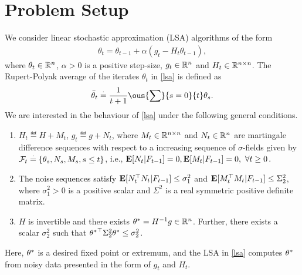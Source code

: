 \section{Problem Setup}
We consider linear stochastic approximation (LSA) algorithms of the form
\begin{align}\label{lsa}
\theta_{t}=\theta_{t-1}+\alpha(g_t-H_t\theta_{t-1}),
\end{align}
where $\theta_t\in \mathbb{R}^n$, $\alpha>0$ is a positive step-size, $g_t\in \mathbb{R}^n$ and $H_t\in \mathbb{R}^{n\times n}$. The Rupert-Polyak average of the iterates $\theta_t$ in \eqref{lsa} is defined as
\begin{align}\label{rp} \tb_t\eqdef \frac{1}{t+1}\ous{\sum}{s=0}{t} \theta_s. \end{align}
We are interested in the behaviour of \eqref{lsa} under the following general conditions.
\begin{assumption}\label{genlsa}
\begin{enumerate}
\item\label{mart} $H_t\eqdef H+M_t$, $g_t\eqdef g+N_t$, where $M_t\in \mathbb{R}^{n\times n}$ and $N_t\in \mathbb{R}^n$ are martingale difference sequences with respect to a increasing sequence of $\sigma$-fields given by $\mathcal{F}_t\stackrel{\cdot}{=} \{\theta_s, N_s,M_s,s\leq t\}$, i.e., $\mathbf{E}[N_t|F_{t-1}]=0,\mathbf{E}[M_t|F_{t-1}]=0,~\forall t\geq 0$.
\item \label{noise} The noise sequences satisfy $\mathbf{E}[N_t^\top N_t|F_{t-1}]\leq \sigma_1^2$ and $\mathbf{E}[M_t^\top M_t|F_{t-1}]\leq \Sigma_2^2$, where $\sigma_1^2>0$ is a positive scalar and $\Sigma^2$ is a real symmetric positive definite matrix.
\item \label{mat} $H$ is invertible and there exists $\theta^*=H^{-1}g\in\mathbb{R}^n$. Further, there exists a scalar $\sigma_2^2$ such that ${\theta^*}^\top\Sigma_2^2\theta^*\leq \sigma_2^2$.
\end{enumerate}
\end{assumption}
Here, $\theta^*$ is a desired fixed point or extremum, and the LSA in \eqref{lsa} computes $\theta^*$ from noisy data presented in the form of $g_t$ and $H_t$.\par


